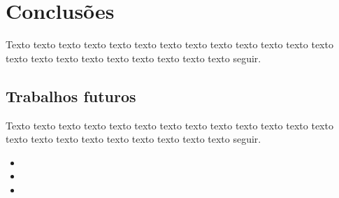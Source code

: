 




\chapter{Conclusões}
\label{chap:conclusao}

 Texto texto texto texto texto texto texto texto texto texto texto texto texto texto texto texto texto texto texto texto texto texto seguir.







\section{Trabalhos futuros}
\label{sec:trab_futu}

Texto texto texto texto texto texto texto texto texto texto texto texto texto texto texto texto texto texto texto texto texto texto seguir.

\begin{itemize}
    \item 
    \item 
    \item 
\end{itemize}






